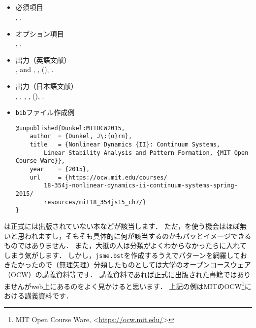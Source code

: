 \documentclass[a4paper,fleqn,uplatex,dvipdfmx]{jsarticle}
\newcommand{\jsmefile}{\texttt{jsme.bst}}
\begin{document}
\subsection{\ttunpublished}
\label{ssec:unpublished}
\begin{screen}
    \begin{itemize}
        \item 必須項目 \\
        \ttauthor, \tttitle, \ttnote
        \item オプション項目 \\
        \ttmonth, \ttyear, \ttkey
        \item 出力（英語文献） \\
            \colorbox[gray]{0.8}{\ttauthorf}, \colorbox[gray]{0.8}{\ttauthors} and \colorbox[gray]{0.8}{\ttauthort}, \colorbox[gray]{0.8}{\tttitle}, (\colorbox[gray]{0.8}{\ttyear}), \colorbox[gray]{0.8}{\ttnote}.
        \item 出力（日本語文献） \\
            \colorbox[gray]{0.8}{\ttauthorf}, \colorbox[gray]{0.8}{\ttauthors}, \colorbox[gray]{0.8}{\ttauthort}, \colorbox[gray]{0.8}{\tttitle}, (\colorbox[gray]{0.8}{\ttyear}), \colorbox[gray]{0.8}{\ttnote}.
        \item \verb|bib|ファイル作成例 \vspace{-3mm}
\begin{verbatim}
@unpublished{Dunkel:MITOCW2015,
    author  = {Dunkel, J\:{o}rn},
    title   = {Nonlinear Dynamics {II}: Continuum Systems, 
        Linear Stability Analysis and Pattern Formation, {MIT Open Course Ware}},
    year    = {2015},
    url     = {https://ocw.mit.edu/courses/
        18-354j-nonlinear-dynamics-ii-continuum-systems-spring-2015/
        resources/mit18_354js15_ch7/}
}
\end{verbatim}
    \end{itemize}
\end{screen}

\ttunpublished は正式には出版されていない本などが該当します．
ただ，\ttunpublished を使う機会はほぼ無いと思われますし，そもそも具体的に何が該当するのかもパッとイメージできるものではありません．
また，大抵の人は分類がよくわからなかったら\hyperref[ssec:misc]{\ttmisc}に入れてしまう気がします．
しかし，\jsmefile を作成するうえでパターンを網羅しておきたかったので（無理矢理）分類したものとしては大学のオープンコースウェア（OCW）の講義資料等です．
講義資料であれば正式に出版された書籍ではありませんがweb上にあるのをよく見かけると思います．
上記の例はMITのOCW\footnote{MIT Open Course Ware, \textless\url{https://ocw.mit.edu/}\textgreater}における講義資料です．
\end{document}
